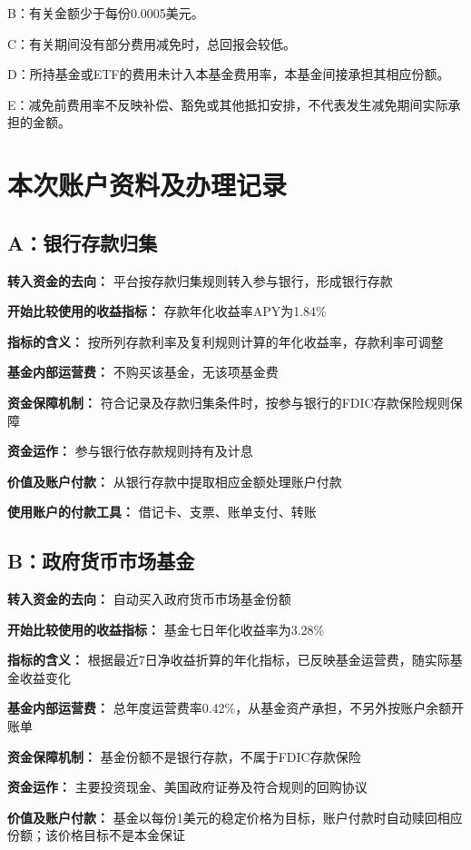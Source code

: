 \documentclass[UTF8,fontset=none,11pt,a4paper]{ctexart}
\begin{document}
B：有关金额少于每份0.0005美元。


C：有关期间没有部分费用减免时，总回报会较低。


D：所持基金或ETF的费用未计入本基金费用率，本基金间接承担其相应份额。


E：减免前费用率不反映补偿、豁免或其他抵扣安排，不代表发生减免期间实际承担的金额。


\section*{本次账户资料及办理记录}
\subsection*{A：银行存款归集}
\textbf{转入资金的去向：} 平台按存款归集规则转入参与银行，形成银行存款


\textbf{开始比较使用的收益指标：} 存款年化收益率APY为1.84\%


\textbf{指标的含义：} 按所列存款利率及复利规则计算的年化收益率，存款利率可调整


\textbf{基金内部运营费：} 不购买该基金，无该项基金费


\textbf{资金保障机制：} 符合记录及存款归集条件时，按参与银行的FDIC存款保险规则保障


\textbf{资金运作：} 参与银行依存款规则持有及计息


\textbf{价值及账户付款：} 从银行存款中提取相应金额处理账户付款


\textbf{使用账户的付款工具：} 借记卡、支票、账单支付、转账


\subsection*{B：政府货币市场基金}
\textbf{转入资金的去向：} 自动买入政府货币市场基金份额


\textbf{开始比较使用的收益指标：} 基金七日年化收益率为3.28\%


\textbf{指标的含义：} 根据最近7日净收益折算的年化指标，已反映基金运营费，随实际基金收益变化


\textbf{基金内部运营费：} 总年度运营费率0.42\%，从基金资产承担，不另外按账户余额开账单


\textbf{资金保障机制：} 基金份额不是银行存款，不属于FDIC存款保险


\textbf{资金运作：} 主要投资现金、美国政府证券及符合规则的回购协议


\textbf{价值及账户付款：} 基金以每份1美元的稳定价格为目标，账户付款时自动赎回相应份额；该价格目标不是本金保证
\end{document}

